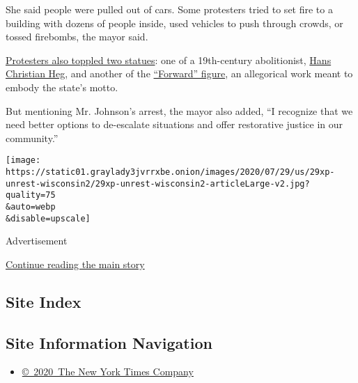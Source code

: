 She said people were pulled out of cars. Some protesters tried to set
fire to a building with dozens of people inside, used vehicles to push
through crowds, or tossed firebombs, the mayor said.

\href{https://www.nytimes3xbfgragh.onion/2020/06/24/us/tim-carpenter-wisconsin-senator-protest.html}{Protesters
also toppled two statues}: one of a 19th-century abolitionist,
\href{https://www.nps.gov/people/hans-heg.htm}{Hans Christian Heg}, and
another of the
\href{https://www.wisconsinhistory.org/Records/Article/CS2752}{``Forward''
figure}, an allegorical work meant to embody the state's motto.

But mentioning Mr. Johnson's arrest, the mayor also added, ``I recognize
that we need better options to de-escalate situations and offer
restorative justice in our community.''

\texttt{[image: https://static01.graylady3jvrrxbe.onion/images/2020/07/29/us/29xp-unrest-wisconsin2/29xp-unrest-wisconsin2-articleLarge-v2.jpg?quality=75\\\&auto=webp\\\&disable=upscale]}

Advertisement

\protect\hyperlink{after-bottom}{Continue reading the main story}

\hypertarget{site-index}{%
\subsection{Site Index}\label{site-index}}

\hypertarget{site-information-navigation}{%
\subsection{Site Information
Navigation}\label{site-information-navigation}}

\begin{itemize}
\tightlist
\item
  \href{https://help.nytimes3xbfgragh.onion/hc/en-us/articles/115014792127-Copyright-notice}{©~2020~The
  New York Times Company}
\end{itemize}

